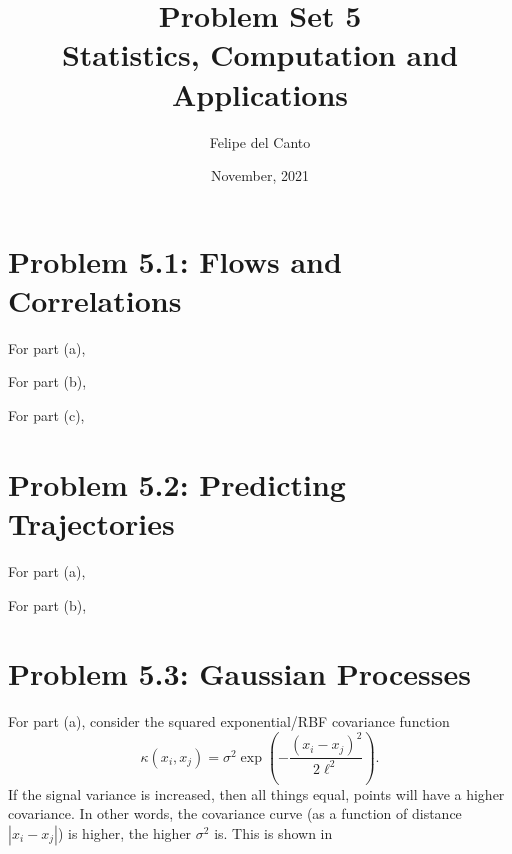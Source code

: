 \documentclass[11pt, english]{article}
\title{\bf Problem Set 5 \\ Statistics, Computation and
Applications\\[-1ex]}
\author{Felipe del Canto}
\date{November, 2021}
\begin{document}
    
\maketitle
   
\begin{multicols}{2}

\section*{Problem 5.1: Flows and Correlations}

For part (a),

For part (b),

For part (c),

\section*{Problem 5.2: Predicting Trajectories}

For part (a),

For part (b),


\section*{Problem 5.3: Gaussian Processes}

For part (a), consider the squared exponential/RBF covariance function
	$$\kappa(x_{i}, x_{j}) = \sigma^{2}\exp\left(-\frac{(x_{i} - x_{j})^{2}}{2\ell^{2}}\right).$$
If the signal variance is increased, then all things equal, points will have a higher covariance. In other words, the covariance curve (as a function of distance $|x_{i} - x_{j}|$) is higher, the higher $\sigma^{2}$ is. This is shown in 


\end{multicols}
\end{document}
